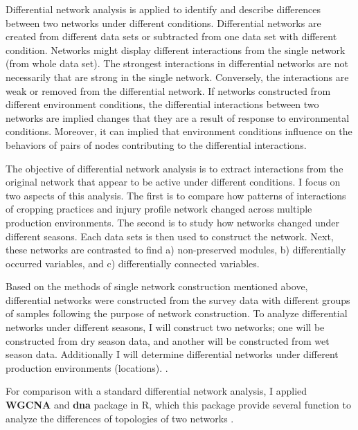 Differential network analysis is applied to identify and describe differences between two networks under different conditions. Differential networks are created from different data sets or subtracted from one data set with different condition. Networks might display different interactions from the single network (from whole data set). The strongest interactions in differential networks are not necessarily that are strong in the single network. Conversely, the interactions are weak or removed from the differential network. If networks constructed from different environment conditions, the differential interactions between two networks are implied changes that they are a result of response to environmental conditions. Moreover, it can implied that environment conditions influence on the behaviors of pairs of nodes contributing to the differential interactions. 


The objective of differential network analysis is to extract interactions from the original network that appear to be active under different conditions. I focus on two aspects of this analysis. The first is to compare how patterns of interactions of cropping practices and injury profile network changed across multiple production environments. The second is to study how networks changed under different seasons. Each data sets is then used to construct the network. Next, these networks are contrasted to find a) non-preserved modules, b) differentially occurred variables, and c) differentially connected variables.

Based on the methods of single network construction mentioned above, differential networks were constructed from the survey data with different groups of samples following the purpose of network construction. To analyze differential networks under different seasons, I will construct two networks; one will be constructed from dry season data, and another will be constructed from wet season data. Additionally I will determine differential networks under different production environments (locations).
.

For comparison with a standard differential network analysis, I applied \textbf{WGCNA}  and \textbf{dna}  package in R, which this package provide several function to analyze the differences of topologies of two networks . 



